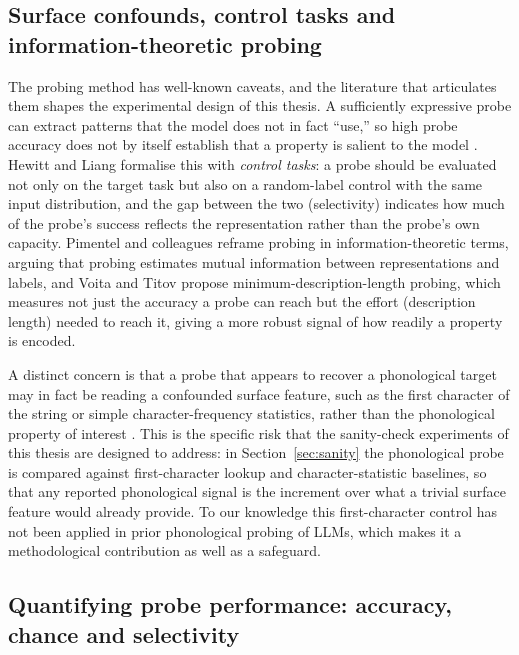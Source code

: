 \subsection{Surface confounds, control tasks and information-theoretic probing}

The probing method has well-known caveats, and the literature that articulates them shapes the experimental design of this thesis. A sufficiently expressive probe can extract patterns that the model does not in fact ``use,'' so high probe accuracy does not by itself establish that a property is salient to the model \cite{belinkov2022probing}. Hewitt and Liang \cite{hewitt2019control} formalise this with \emph{control tasks}: a probe should be evaluated not only on the target task but also on a random-label control with the same input distribution, and the gap between the two (selectivity) indicates how much of the probe's success reflects the representation rather than the probe's own capacity. Pimentel and colleagues \cite{pimentel2020information} reframe probing in information-theoretic terms, arguing that probing estimates mutual information between representations and labels, and Voita and Titov \cite{voita2020mdl} propose minimum-description-length probing, which measures not just the accuracy a probe can reach but the effort (description length) needed to reach it, giving a more robust signal of how readily a property is encoded.

A distinct concern is that a probe that appears to recover a phonological target may in fact be reading a confounded surface feature, such as the first character of the string or simple character-frequency statistics, rather than the phonological property of interest \cite{belinkov2022probing,pimentel2020information}. This is the specific risk that the sanity-check experiments of this thesis are designed to address: in Section~\ref{sec:sanity} the phonological probe is compared against first-character lookup and character-statistic baselines, so that any reported phonological signal is the increment over what a trivial surface feature would already provide. To our knowledge this first-character control has not been applied in prior phonological probing of LLMs, which makes it a methodological contribution as well as a safeguard.

\subsection{Quantifying probe performance: accuracy, chance and selectivity}
\label{sec:probe-metrics}

